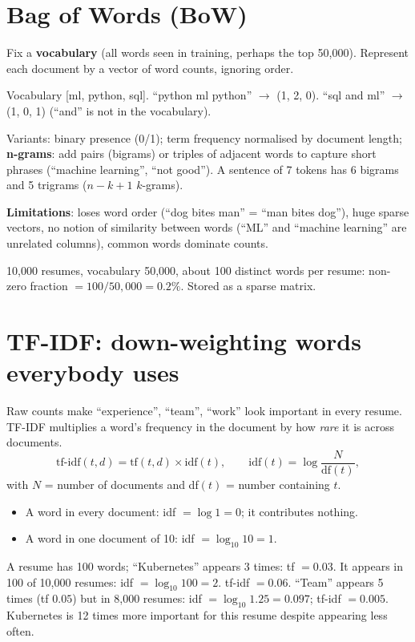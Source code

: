 \section{Bag of Words (BoW)}
Fix a \textbf{vocabulary} (all words seen in training, perhaps the top 50{,}000). Represent each document by a vector of word counts, ignoring
order.
\begin{example}
Vocabulary [ml, python, sql]. ``python ml python'' $\to$ (1, 2, 0). ``sql and ml'' $\to$ (1, 0, 1) (``and'' is not in the vocabulary).
\end{example}
Variants: binary presence (0/1); term frequency normalised by document length; \textbf{n-grams}: add pairs (bigrams) or triples of adjacent words
to capture short phrases (``machine learning'', ``not good''). A sentence of 7 tokens has 6 bigrams and 5 trigrams ($n - k + 1$ $k$-grams).

\textbf{Limitations}: loses word order (``dog bites man'' = ``man bites dog''), huge sparse vectors, no notion of similarity between words
(``ML'' and ``machine learning'' are unrelated columns), common words dominate counts.
\begin{example}[: sparsity]
10{,}000 resumes, vocabulary 50{,}000, about 100 distinct words per resume: non-zero fraction $= 100/50{,}000 = 0.2\%$. Stored as a sparse matrix.
\end{example}

\section{TF-IDF: down-weighting words everybody uses}
Raw counts make ``experience'', ``team'', ``work'' look important in every resume. TF-IDF multiplies a word's frequency in the document by how
\emph{rare} it is across documents.
\[ \text{tf-idf}(t, d) = \text{tf}(t, d)\times\text{idf}(t),\qquad \text{idf}(t) = \log\frac{N}{\text{df}(t)}, \]
with $N$ = number of documents and df$(t)$ = number containing $t$.
\begin{itemize}
\item A word in every document: idf $= \log1 = 0$; it contributes nothing.
\item A word in one document of 10: idf $= \log_{10}10 = 1$.
\end{itemize}
\begin{example}
A resume has 100 words; ``Kubernetes'' appears 3 times: tf $= 0.03$. It appears in 100 of 10{,}000 resumes: idf $= \log_{10}100 = 2$.
tf-idf $= 0.06$. ``Team'' appears 5 times (tf $0.05$) but in 8{,}000 resumes: idf $= \log_{10}1.25 = 0.097$; tf-idf $= 0.005$.
Kubernetes is 12 times more important for this resume despite appearing less often.
\end{example}


